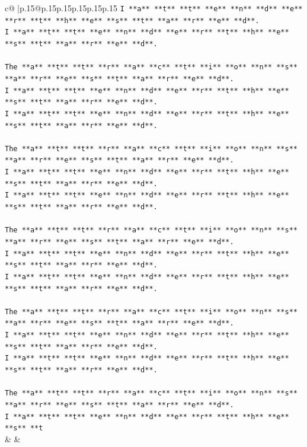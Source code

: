 \documentclass{article}
\begin{document}
{\begin{supertabular}{c@{$\;$}|p{.15\linewidth}@{}p{.15\linewidth}p{.15\linewidth}p{.15\linewidth}p{.15\linewidth}p{.15\linewidth}}
{{{\texttt{I **a** **t** **t** **e** **n** **d** **e** **r** **t** **h** **e** **s** **t** **a** **r** **e** **d**.} \\
\texttt{I **a** **t** **t** **e** **n** **d** **e** **r** **t** **h** **e** **s** **t** **a** **r** **e** **d**.} \\
\\ 
\texttt{The **a** **t** **t** **r** **a** **c** **t** **i** **o** **n** **s** **a** **r** **e** **s** **t** **a** **r** **e** **d**.} \\
\texttt{I **a** **t** **t** **e** **n** **d** **e** **r** **t** **h** **e** **s** **t** **a** **r** **e** **d**.} \\
\texttt{I **a** **t** **t** **e** **n** **d** **e** **r** **t** **h** **e** **s** **t** **a** **r** **e** **d**.} \\
\\ 
\texttt{The **a** **t** **t** **r** **a** **c** **t** **i** **o** **n** **s** **a** **r** **e** **s** **t** **a** **r** **e** **d**.} \\
\texttt{I **a** **t** **t** **e** **n** **d** **e** **r** **t** **h** **e** **s** **t** **a** **r** **e** **d**.} \\
\texttt{I **a** **t** **t** **e** **n** **d** **e** **r** **t** **h** **e** **s** **t** **a** **r** **e** **d**.} \\
\\ 
\texttt{The **a** **t** **t** **r** **a** **c** **t** **i** **o** **n** **s** **a** **r** **e** **s** **t** **a** **r** **e** **d**.} \\
\texttt{I **a** **t** **t** **e** **n** **d** **e** **r** **t** **h** **e** **s** **t** **a** **r** **e** **d**.} \\
\texttt{I **a** **t** **t** **e** **n** **d** **e** **r** **t** **h** **e** **s** **t** **a** **r** **e** **d**.} \\
\\ 
\texttt{The **a** **t** **t** **r** **a** **c** **t** **i** **o** **n** **s** **a** **r** **e** **s** **t** **a** **r** **e** **d**.} \\
\texttt{I **a** **t** **t** **e** **n** **d** **e** **r** **t** **h** **e** **s** **t** **a** **r** **e** **d**.} \\
\texttt{I **a** **t** **t** **e** **n** **d** **e** **r** **t** **h** **e** **s** **t** **a** **r** **e** **d**.} \\
\\ 
\texttt{The **a** **t** **t** **r** **a** **c** **t** **i** **o** **n** **s** **a** **r** **e** **s** **t** **a** **r** **e** **d**.} \\
\texttt{I **a** **t** **t** **e** **n** **d** **e** **r** **t** **h** **e** **s** **t} \\
            }
        }
    }
    & & \\ \\


\end{supertabular}}
\end{document}
